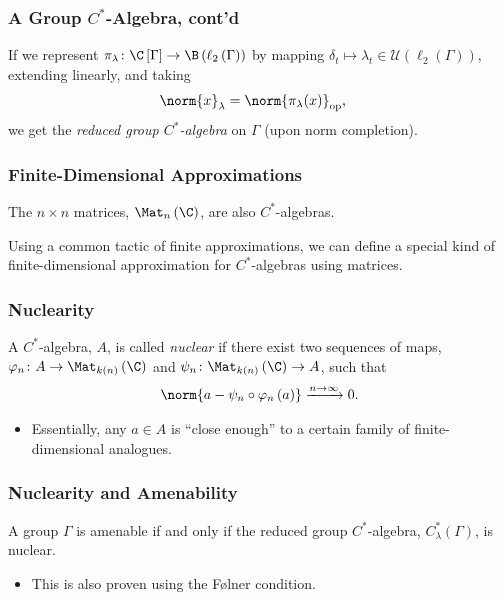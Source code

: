 \documentclass{beamer-custom}
\DeclareMathOperator{\op}{op}
\begin{document}
\begin{frame}
  \frametitle{A Group $C^{\ast}$-Algebra, cont'd}
  If we represent $\pi_{\lambda}\colon \C\left[ \Gamma \right]\rightarrow \B\left( \ell_2\left( \Gamma \right) \right)$ by mapping $\delta_t \mapsto \lambda_{t}\in \mathcal{U}\left( \ell_2\left( \Gamma \right) \right)$, extending linearly, and taking
  \begin{align*}
    \norm{x}_{\lambda} &= \norm{\pi_{\lambda}(x)}_{\op},
  \end{align*}
  we get the \textit{reduced group $C^{\ast}$-algebra} on $\Gamma$ (upon norm completion).
\end{frame}
\begin{frame}
  \frametitle{Finite-Dimensional Approximations}
  The $n\times n$ matrices, $\Mat_n\left( \C \right)$, are also $C^{\ast}$-algebras.\newline

  Using a common tactic of finite approximations, we can define a special kind of finite-dimensional approximation for $C^{\ast}$-algebras using matrices.
\end{frame}
\begin{frame}
  \frametitle{Nuclearity}
  A $C^{\ast}$-algebra, $A$, is called \textit{nuclear} if there exist two sequences of maps, $\varphi_n\colon A\rightarrow \Mat_{k(n)}\left( \C \right)$ and $\psi_n\colon \Mat_{k(n)}\left( \C \right)\rightarrow A$, such that
  \begin{align*}
    \norm{a - \psi_n\circ\varphi_n\left( a \right)} \xrightarrow{n\rightarrow\infty} 0.
  \end{align*}
  \begin{itemize}
    \item Essentially, any $a\in A$ is ``close enough'' to a certain family of finite-dimensional analogues.
  \end{itemize}
\end{frame}
\begin{frame}
  \frametitle{Nuclearity and Amenability}
  A group $\Gamma$ is amenable if and only if the reduced group $C^{\ast}$-algebra, $C^{\ast}_{\lambda}\left( \Gamma \right)$, is nuclear.\pause
  \begin{itemize}
    \item This is also proven using the Følner condition.
  \end{itemize}
\end{frame}
\end{document}
